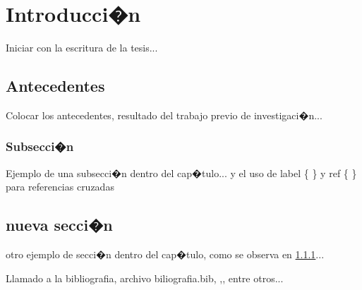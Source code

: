 \chapter{Introducci�n}

Iniciar con la escritura de la tesis...

\clearpage


\section{Antecedentes}

Colocar los antecedentes, resultado del trabajo previo de investigaci�n... %

\subsection{Subsecci�n} \label{haptica} %

Ejemplo de una subsecci�n dentro del cap�tulo... y el uso de label \{ \} y ref \{ \} para referencias cruzadas


\section{nueva secci�n}\label{IH}

otro ejemplo de secci�n dentro del cap�tulo, como se observa en \ref{haptica}... %

Llamado a la bibliografia, archivo biliografia.bib, \cite{Abowd},\cite{C2link1}, entre otros...

\newpage


